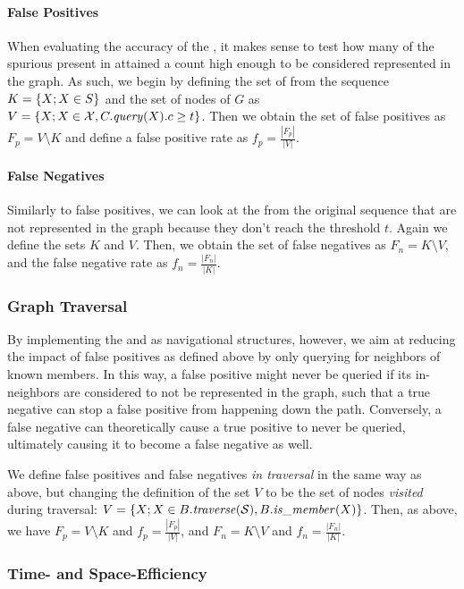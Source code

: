 \paragraph{False Positives} When evaluating the accuracy of the \dBCM, it makes sense to test how many of the spurious  present in \readset attained a count high enough to be considered represented in the graph. As such, we begin by defining the set of  from the sequence $K = \{X ; X \in \strname{S}\}$ and the set of nodes of $G$ as $V = \{X ; X \in \readset, C.\mathit{query}(X).c \geq t\}$. Then we obtain the set of false positives as $F_p = V \setminus K$ and define a false positive rate as $f_p = \frac{|F_p|}{|V|}$.

\paragraph{False Negatives} Similarly to false positives, we can look at the  from the original sequence that are not represented in the graph because they don't reach the threshold $t$. Again we define the sets $K$ and $V$. Then, we obtain the set of false negatives as $F_n = K \setminus V$, and the false negative rate as $f_n = \frac{|F_n|}{|K|}$.

\subsubsection{Graph Traversal}

By implementing the \dBCM and \dBHT as navigational structures, however, we aim at reducing the impact of false positives as defined above by only querying for neighbors of known members. In this way, a false positive \kmer might never be queried if its in-neighbors are considered to not be represented in the graph, such that a true negative can stop a false positive from happening down the path. Conversely, a false negative can theoretically cause a true positive to never be queried, ultimately causing it to become a false negative as well.


We define false positives and false negatives \emph{in traversal} in the same way as above, but changing the definition of the set $V$ to be the set of nodes \emph{visited} during traversal: $V = \{X ; X \in B.\mathit{traverse}(\strsetname{S}), B.\mathit{is\_member}(X)\}$. Then, as above, we have $F_p = V \setminus K$ and $f_p = \frac{|F_p|}{|V|}$, and $F_n = K \setminus V$ and $f_n = \frac{|F_n|}{|K|}$.

\subsubsection{Time- and Space-Efficiency}

